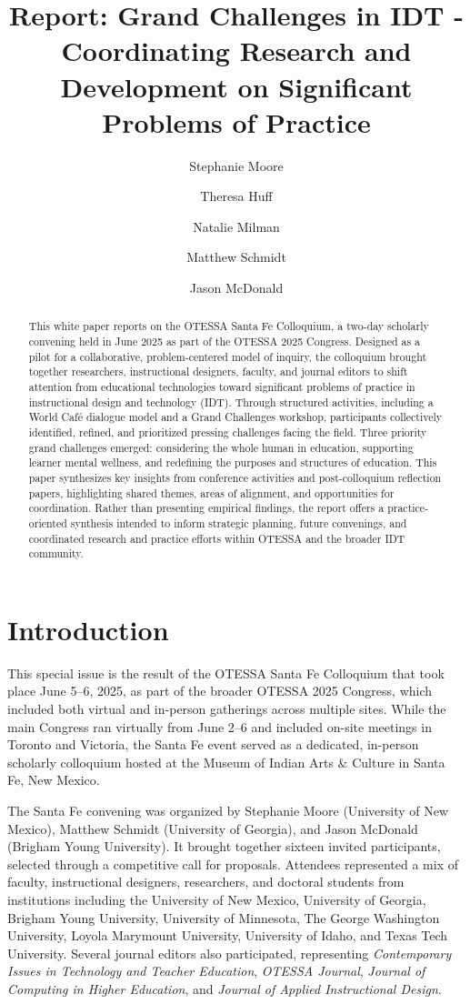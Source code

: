 \documentclass[
  letterpaper,
  DIV=11,
  numbers=noendperiod]{scrartcl}
\title{Report: Grand Challenges in IDT - Coordinating Research and
Development on Significant Problems of Practice}
\author{Stephanie Moore \and Theresa Huff \and Natalie
Milman \and Matthew Schmidt \and Jason McDonald}
\date{}
\begin{document}
\maketitle
\begin{abstract}
This white paper reports on the OTESSA Santa Fe Colloquium, a two-day
scholarly convening held in June 2025 as part of the OTESSA 2025
Congress. Designed as a pilot for a collaborative, problem-centered
model of inquiry, the colloquium brought together researchers,
instructional designers, faculty, and journal editors to shift attention
from educational technologies toward significant problems of practice in
instructional design and technology (IDT). Through structured
activities, including a World Café dialogue model and a Grand Challenges
workshop, participants collectively identified, refined, and prioritized
pressing challenges facing the field. Three priority grand challenges
emerged: considering the whole human in education, supporting learner
mental wellness, and redefining the purposes and structures of
education. This paper synthesizes key insights from conference
activities and post-colloquium reflection papers, highlighting shared
themes, areas of alignment, and opportunities for coordination. Rather
than presenting empirical findings, the report offers a
practice-oriented synthesis intended to inform strategic planning,
future convenings, and coordinated research and practice efforts within
OTESSA and the broader IDT community.
\end{abstract}


\section{\texorpdfstring{\textbf{Introduction}}{Introduction}}\label{introduction}

This special issue is the result of the OTESSA Santa Fe Colloquium that
took place June 5--6, 2025, as part of the broader OTESSA 2025 Congress,
which included both virtual and in-person gatherings across multiple
sites. While the main Congress ran virtually from June 2--6 and included
on-site meetings in Toronto and Victoria, the Santa Fe event served as a
dedicated, in-person scholarly colloquium hosted at the Museum of Indian
Arts \& Culture in Santa Fe, New Mexico.

The Santa Fe convening was organized by Stephanie Moore (University of
New Mexico), Matthew Schmidt (University of Georgia), and Jason McDonald
(Brigham Young University). It brought together sixteen invited
participants, selected through a competitive call for proposals.
Attendees represented a mix of faculty, instructional designers,
researchers, and doctoral students from institutions including the
University of New Mexico, University of Georgia, Brigham Young
University, University of Minnesota, The George Washington University,
Loyola Marymount University, University of Idaho, and Texas Tech
University. Several journal editors also participated, representing
\emph{Contemporary Issues in Technology and Teacher Education},
\emph{OTESSA Journal}, \emph{Journal of Computing in Higher Education},
and \emph{Journal of Applied Instructional Design}.
\end{document}
